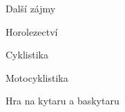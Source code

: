 \documentclass{resume} %
\begin{document}

\begin{rSection}{Dal\v{s}\'{i} z\'{a}jmy}

\item Horolezectv\'{i}
\item Cyklistika
\item Motocyklistika
\item Hra na kytaru a baskytaru

\end{rSection}

\end{document}
